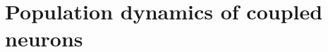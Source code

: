 \documentclass[12pt,twoside]{report}
\begin{document}
\chapter{Population dynamics of coupled neurons}
\label{chap:coupled}



\clearpage

%

%
%
%
%

\renewcommand{\bibname}{References} %

\nocite{GerKis14,WilCow72,GerKis02,KniMan96,MatGiu02,Mat16_arxiv,SchOst13,Sch13,DayAbb05,Ris84,Vre10,OstBru11,AugLad17,Prij93,Lef09,KanSch00,Kni72,Ger00,ChiGra07,ChiGra08,SchDeg17}






\end{document}
